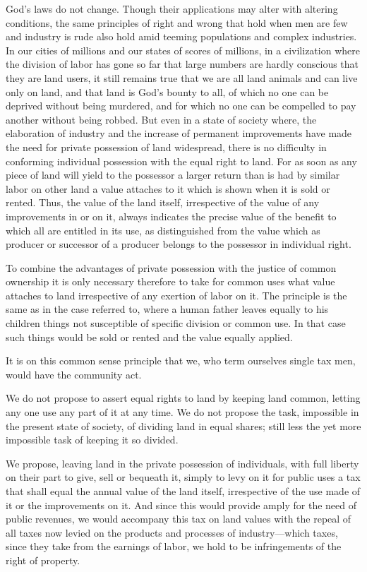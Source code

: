 \documentclass{book}
\begin{document}
God’s laws do not change. Though their applications may alter with altering conditions, the same principles of right and wrong that hold when men are few and industry is rude also hold amid teeming populations and complex industries. In our cities of millions and our states of scores of millions, in a civilization where the division of labor has gone so far that large numbers are hardly conscious that they are land users, it still remains true that we are all land animals and can live only on land, and that land is God’s bounty to all, of which no one can be deprived without being murdered, and for which no one can be compelled to pay another without being robbed. But even in a state of society where, the elaboration of industry and the increase of permanent improvements have made the need for private possession of land widespread, there is no difficulty in conforming individual possession with the equal right to land. For as soon as any piece of land will yield to the possessor a larger return than is had by similar labor on other land a value attaches to it which is shown when it is sold or rented. Thus, the value of the land itself, irrespective of the value of any improvements in or on it, always indicates the precise value of the benefit to which all are entitled in its use, as distinguished from the value which as producer or successor of a producer belongs to the possessor in individual right.

To combine the advantages of private possession with the justice of common ownership it is only necessary therefore to take for common uses what value attaches to land irrespective of any exertion of labor on it. The principle is the same as in the case referred to, where a human father leaves equally to his children things not susceptible of specific division or common use. In that case such things would be sold or rented and the value equally applied.

It is on this common sense principle that we, who term ourselves single tax men, would have the community act.

We do not propose to assert equal rights to land by keeping land common, letting any one use any part of it at any time. We do not propose the task, impossible in the present state of society, of dividing land in equal shares; still less the yet more impossible task of keeping it so divided.

We propose, leaving land in the private possession of individuals, with full liberty on their part to give, sell or bequeath it, simply to levy on it for public uses a tax that shall equal the annual value of the land itself, irrespective of the use made of it or the improvements on it. And since this would provide amply for the need of public revenues, we would accompany this tax on land values with the repeal of all taxes now levied on the products and processes of industry—which taxes, since they take from the earnings of labor, we hold to be infringements of the right of property.
\end{document}

